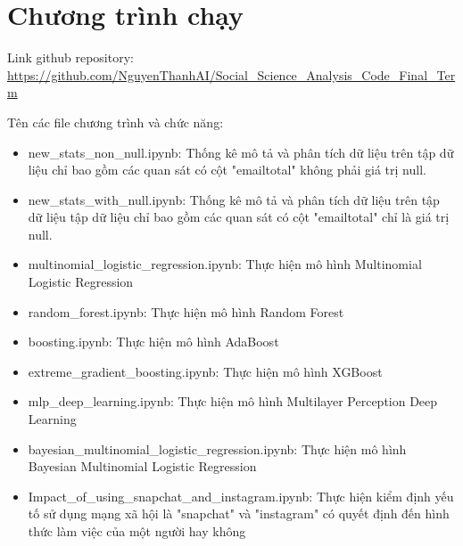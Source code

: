 \documentclass[14pt, a4paper]{article}
\numberwithin{equation}{section}
\numberwithin{figure}{section}
\theoremstyle{sltheorem}
\theoremstyle{soltheorem}
\begin{document}


\newpage
\section{Chương trình chạy}

Link github repository: \url{https://github.com/NguyenThanhAI/Social_Science_Analysis_Code_Final_Term}

Tên các file chương trình và chức năng:

\begin{itemize}
    \item new\_stats\_non\_null.ipynb: Thống kê mô tả và phân tích dữ liệu trên tập dữ liệu chỉ bao gồm các quan sát có cột "emailtotal" không phải giá trị null.
    \item new\_stats\_with\_null.ipynb: Thống kê mô tả và phân tích dữ liệu trên tập dữ liệu tập dữ liệu chỉ bao gồm các quan sát có cột "emailtotal" chỉ là giá trị null.
    \item multinomial\_logistic\_regression.ipynb: Thực hiện mô hình Multinomial Logistic Regression
    \item random\_forest.ipynb: Thực hiện mô hình Random Forest
    \item boosting.ipynb: Thực hiện mô hình AdaBoost 
    \item extreme\_gradient\_boosting.ipynb: Thực hiện mô hình XGBoost
    \item mlp\_deep\_learning.ipynb: Thực hiện mô hình Multilayer Perception Deep Learning
    \item bayesian\_multinomial\_logistic\_regression.ipynb: Thực hiện mô hình Bayesian Multinomial Logistic Regression
    \item Impact\_of\_using\_snapchat\_and\_instagram.ipynb: Thực hiện kiểm định yếu tố sử dụng mạng xã hội là "snapchat" và "instagram" có quyết định đến hình thức làm việc của một người hay không
\end{itemize}


\end{document}
